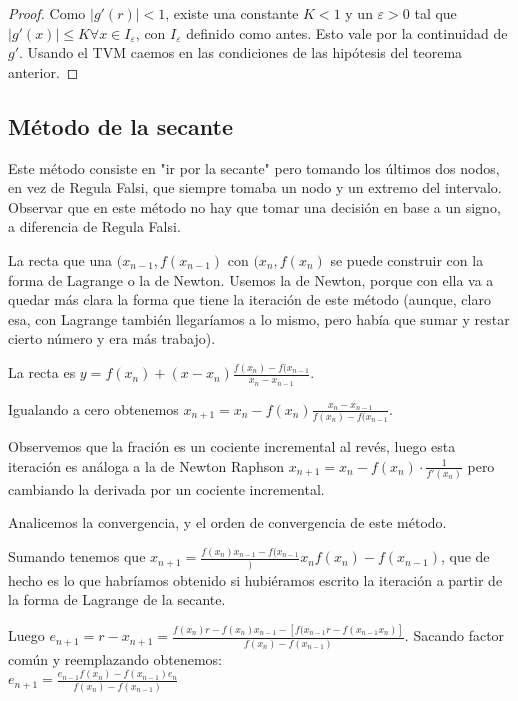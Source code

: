 \documentclass[10pt,a4paper,final]{report}
\begin{document}
{\begin{proof}
	Como $|g'(r)|<1$, existe una constante $K<1$ y un $\varepsilon > 0$ tal que $|g'(x)|\leq K \forall x \in I_\varepsilon$, con $I_\varepsilon$ definido como antes. Esto vale por la continuidad de $g'$. Usando el TVM caemos en las condiciones de las hipótesis del teorema anterior.
\end{proof}

\subsection{Método de la secante}

Este método consiste en "ir por la secante" pero tomando los últimos dos nodos, en vez de Regula Falsi, que siempre tomaba un nodo y un extremo del intervalo. Observar que en este método no hay que tomar una decisión en base a un signo, a diferencia de Regula Falsi.

La recta que una $(x_{n-1},f(x_{n-1})$ con $(x_n,f(x_n)$ se puede construir con la forma de Lagrange o la de Newton. Usemos la de Newton, porque con ella va a quedar más clara la forma que tiene la iteración de este método (aunque, claro esa, con Lagrange también llegaríamos a lo mismo, pero había que sumar y restar cierto número y era más trabajo).

La recta es $y = f(x_n) + (x-x_n) \frac{f(x_n) - f(x_{n-1}}{x_n - x_{n-1}}$.

Igualando a cero obtenemos $x_{n+1} = x_n - f(x_n) \frac{x_n - x_{n-1}}{f(x_n) - f(x_{n-1}}$.

Observemos que la fración es un cociente incremental al revés, luego esta iteración es análoga a la de Newton Raphson $x_{n+1} = x_n - f(x_n) \cdot \frac{1}{f'(x_n)}$ pero cambiando la derivada por un cociente incremental.

Analicemos la convergencia, y el orden de convergencia de este método.

Sumando tenemos que $x_{n+1} = \frac{f(x_n) x_{n-1} - f(x_{n-1}}) x_n {f(x_n) - f(x_{n-1})}$, que de hecho es lo que habríamos obtenido si hubiéramos escrito la iteración a partir de la forma de Lagrange de la secante.

Luego $e_{n+1} = r - x_{n+1} = \frac{f(x_n) r- f(x_n) x_{n-1} - [f(x_{n-1} r - f(x_{n-1} x_n)]}{f(x_n) - f(x_{n-1})}$. Sacando factor común y reemplazando obtenemos:\\
$e_{n+1} = \frac{e_{n-1} f(x_n) - f(x_{n-1}) e_n}{f(x_n) - f(x_{n-1})}$\\

}
\end{document}
